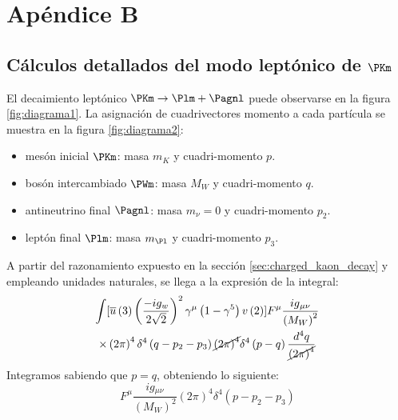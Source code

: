 \appendix
\chapter*{Apéndice B}\label{cap:B}
\setcounter{section}{0}
\renewcommand{\thesection}{B.\arabic{section}}
\setcounter{table}{0}
\renewcommand{\thetable}{B.\arabic{table}}
\setcounter{equation}{0}
\renewcommand{\theequation}{B.\arabic{equation}}

\section{Cálculos detallados del modo leptónico de $\PKm$}\label{sec:detailed_calc}

El decaimiento leptónico $\PKm \rightarrow \Plm + \Pagnl$ puede observarse en la figura \ref{fig:diagrama1}. La asignación de cuadrivectores momento a cada partícula se muestra en la figura \ref{fig:diagrama2}:
\begin{itemize}
\setlength{\itemsep}{0.2\baselineskip}
\item mesón inicial $\PKm$: masa $m_K$ y cuadri-momento $p$.
\item bosón intercambiado $\PWm$: masa $M_W$ y cuadri-momento $q$.
\item antineutrino final $\Pagnl$: masa $m_{\nu}=0$ y cuadri-momento $p_2$.
\item leptón final $\Plm$: masa $m_{\Pl}$ y cuadri-momento $p_3$.
\end{itemize}
A partir del razonamiento expuesto en la sección \ref{sec:charged_kaon_decay} y empleando unidades naturales, se llega a la expresión de la integral:
\begin{multline}
\int[\overline{u}\left( 3\right) \left( \dfrac{-ig_w}{2\sqrt{2}}\right) ^{2}\gamma ^{\mu }\left( 1-\gamma ^{5}\right) v\left( 2\right)]F^{\mu} \dfrac{ig{_{\mu \nu}}}{\left( M_W\right)^{2}}\\ \times \left( 2\pi \right) ^{4}\delta ^{4}\left( q-p_{2}-p_{3}\right) \cancel{\left( 2\pi \right)^{4}}\delta ^{4}\left( p-q\right) \dfrac{d^{4}q}{\cancel{\left( 2\pi \right) ^{4}}}
\end{multline}
Integramos sabiendo que $p=q$, obteniendo lo siguiente:
\begin{equation}
[\overline{u}\left( 3\right) \left( \dfrac{-ig_w}{2\sqrt{2}}\right) ^{2}\gamma ^{\mu }\left( 1-\gamma ^{5}\right) v\left( 2\right)]F^{\mu} \dfrac{ig{_{\mu \nu}}}{\left( M_W\right)^{2}}\left( 2\pi \right) ^{4}\delta ^{4}\left(p-p_{2}-p_{3}\right)
\end{equation}
